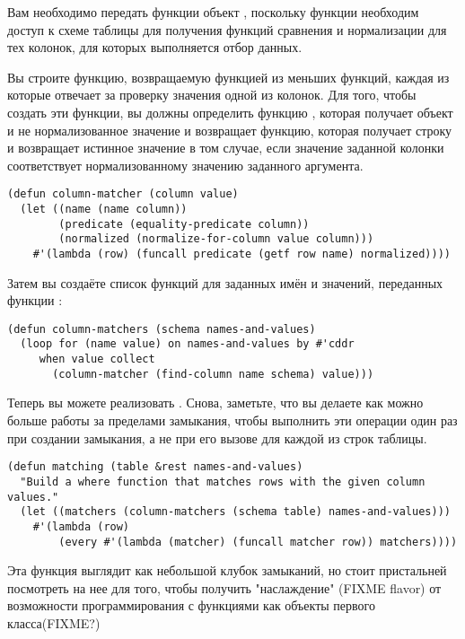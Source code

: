 Вам необходимо передать функции  объект , поскольку функции
необходим доступ к схеме таблицы для получения функций сравнения и нормализации для тех
колонок, для которых выполняется отбор данных.

Вы строите функцию, возвращаемую функцией  из меньших функций, каждая из
которые отвечает за проверку значения одной из колонок.  Для того, чтобы создать эти
функции, вы должны определить функцию , которая получает объект
 и не нормализованное значение и возвращает функцию, которая получает строку
и возвращает истинное значение в том случае, если значение заданной колонки соответствует
нормализованному значению заданного аргумента.

\begin{lstlisting}
(defun column-matcher (column value)
  (let ((name (name column))
        (predicate (equality-predicate column))
        (normalized (normalize-for-column value column)))
    #'(lambda (row) (funcall predicate (getf row name) normalized))))
\end{lstlisting}

Затем вы создаёте список функций  для заданных имён и значений,
переданных функции :

\begin{lstlisting}
(defun column-matchers (schema names-and-values)
  (loop for (name value) on names-and-values by #'cddr
     when value collect
       (column-matcher (find-column name schema) value)))
\end{lstlisting}

Теперь вы можете реализовать .  Снова, заметьте, что вы делаете как можно
больше работы за пределами замыкания, чтобы выполнить эти операции один раз при создании
замыкания, а не при его вызове для каждой из строк таблицы.

\begin{lstlisting}
(defun matching (table &rest names-and-values)
  "Build a where function that matches rows with the given column values."
  (let ((matchers (column-matchers (schema table) names-and-values)))
    #'(lambda (row)
        (every #'(lambda (matcher) (funcall matcher row)) matchers))))
\end{lstlisting}

Эта функция выглядит как небольшой клубок замыканий, но стоит пристальней посмотреть на
нее для того, чтобы получить "наслаждение" (FIXME flavor) от возможности программирования
с функциями как объекты первого класса(FIXME?)


